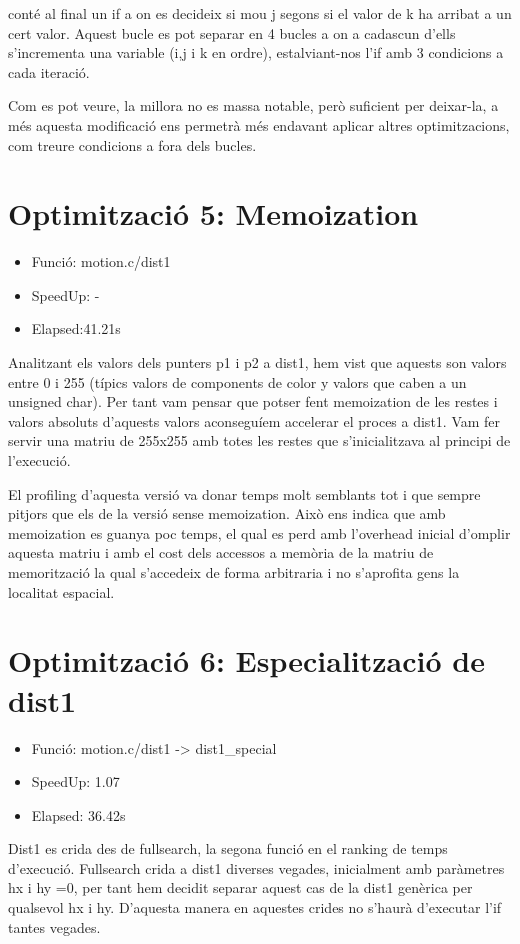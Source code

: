 conté al final un if a on es decideix si mou j segons si el valor de k ha arribat a un cert valor. Aquest bucle es pot separar en 4 bucles a on a cadascun d'ells s'incrementa una variable (i,j i k en ordre), estalviant-nos l'if amb 3 condicions a cada iteració.

Com es pot veure, la millora no es massa notable, però suficient per deixar-la, a més aquesta modificació ens permetrà més endavant aplicar altres optimitzacions, com treure condicions a fora dels bucles.

\section{Optimitzaci\'o 5: Memoization}
\begin{itemize}
\item{Funció: motion.c/dist1}
\item{SpeedUp: -}
\item{Elapsed:41.21s} 
\end{itemize}

Analitzant els valors dels punters p1 i p2 a dist1, hem vist que aquests son valors entre 0 i 255  (típics valors de components de color y valors que caben a un unsigned char). Per tant vam pensar que potser fent memoization de les restes i valors absoluts d'aquests valors aconseguíem accelerar el proces a dist1. Vam fer servir una matriu de 255x255 amb totes les restes que s'inicialitzava al principi de l'execució. 

El profiling d'aquesta versió va donar temps molt semblants tot i que sempre pitjors que els de la versió sense memoization. Això ens indica que amb memoization es guanya poc temps, el qual es perd amb l'overhead inicial d'omplir aquesta matriu i amb el cost dels accessos a memòria de la matriu de memorització la qual s'accedeix de forma arbitraria i no s'aprofita gens la localitat espacial.

\section{Optimitzaci\'o 6: Especialitzaci\'o de dist1}
\begin{itemize}
\item{Funció: motion.c/dist1 -> dist1\_special}
\item{SpeedUp: 1.07}
\item{Elapsed: 36.42s}
\end{itemize}

Dist1 es crida des de fullsearch, la segona funció en el ranking de temps d'execució. Fullsearch crida a dist1 diverses vegades, inicialment amb paràmetres hx i hy =0, per tant hem decidit separar aquest cas de la dist1 genèrica per qualsevol hx i hy. D'aquesta manera en aquestes crides no s'haurà d'executar l'if tantes vegades.

